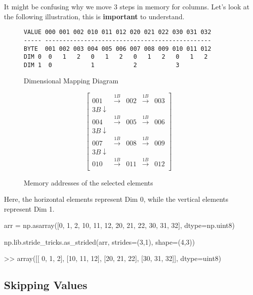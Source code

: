 \documentclass[oneside, 12pt]{report}
\begin{document}
It might be confusing why we move 3 steps in memory for columns. Let's look at the following illustration, this is \textbf{important} to understand.

\begin{figure}[H]
\begin{verbatim}
VALUE 000 001 002 010 011 012 020 021 022 030 031 032
----- -----------------------------------------------
BYTE  001 002 003 004 005 006 007 008 009 010 011 012
DIM 0  0   1   2   0   1   2   0   1   2   0   1   2 
DIM 1  0           1           2           3 
\end{verbatim}
\caption{Dimensional Mapping Diagram}
\end{figure}

\begin{figure}[H]
\begin{equation*}
\begin{bmatrix}
001 & \xrightarrow{1B} & 002 &\xrightarrow{1B} & 003 \\
3B \downarrow \\
004 & \xrightarrow{1B} & 005 &\xrightarrow{1B} & 006 \\
3B \downarrow \\
007 & \xrightarrow{1B} & 008 &\xrightarrow{1B} & 009 \\
3B \downarrow \\
010 & \xrightarrow{1B} & 011 &\xrightarrow{1B} & 012 \\
\end{bmatrix}
\end{equation*}
\caption{Memory addresses of the selected elements}
\end{figure}

\begin{shaded}
Here, the horizontal elements represent Dim 0, while the vertical elements represent Dim 1.
\end{shaded}

\begin{python}
arr = np.asarray([0, 1, 2,
                  10, 11, 12,
                  20, 21, 22,
                  30, 31, 32], dtype=np.uint8)
 
np.lib.stride_tricks.as_strided(arr, strides=(3,1), shape=(4,3))
 
>> array([[ 0,  1,  2],
          [10, 11, 12],
          [20, 21, 22],
          [30, 31, 32]], dtype=uint8)
\end{python}

\subsection{Skipping Values}
\end{document}
